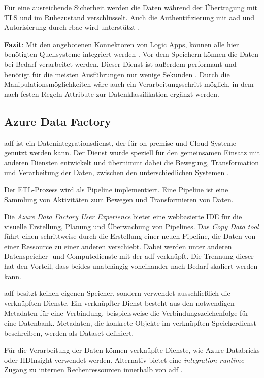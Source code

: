 Für eine ausreichende Sicherheit werden die Daten während der Übertragung mit TLS und im Ruhezustand verschlüsselt. Auch die Authentifizierung mit \ac{aad} und Autorisierung durch \ac{rbac} wird unterstützt \cite{baldwin_azure_2021-1}. 

\textbf{Fazit}: Mit den angebotenen Konnektoren von Logic Apps, können alle hier benötigten Quellsysteme integriert werden \cite[vgl.][]{fan_verwaltete_2021}. Vor dem Speichern können die Daten bei Bedarf verarbeitet werden. Dieser Dienst ist außerdem performant und benötigt für die meisten Ausführungen nur wenige Sekunden \cite{bennett_enterprise_2021}. Durch die Manipulationsmöglichkeiten wäre auch ein Verarbeitungsschritt möglich, in dem nach festen Regeln Attribute zur Datenklassifikation ergänzt werden.

\subsection{Azure Data Factory} \label{sec:grundlagen:azure_dienste:dataFactory}
\ac{adf} ist ein Datenintegrationsdienst, der für on-premise und Cloud Systeme genutzt werden kann. Der Dienst wurde speziell für den gemeinsamen Einsatz mit anderen Diensten entwickelt und übernimmt dabei die Bewegung, Transformation und Verarbeitung der Daten, zwischen den unterschiedlichen Systemen \cite{klein_iot_2017}.

Der ETL-Prozess wird als Pipeline implementiert. Eine Pipeline ist eine Sammlung von Aktivitäten zum Bewegen und Transformieren von Daten. 

Die \textit{Azure Data Factory User Experience} bietet eine webbasierte IDE für die visuelle Erstellung, Planung und Überwachung von Pipelines. Das \textit{Copy Data tool} führt einen schrittweise durch die Erstellung einer neuen Pipeline, die Daten von einer Ressource zu einer anderen verschiebt. Dabei werden unter anderen Datenspeicher- und Computedienste mit der \ac{adf} verknüpft. Die Trennung dieser hat den Vorteil, dass beides unabhängig voneinander nach Bedarf skaliert werden kann.

\ac{adf} besitzt keinen eigenen Speicher, sondern verwendet ausschließlich die verknüpften Dienste. Ein verknüpfter Dienst besteht aus den notwendigen Metadaten für eine Verbindung, beispielsweise die Verbindungszeichenfolge für eine Datenbank. Metadaten, die konkrete Objekte im verknüpften Speicherdienst beschreiben, werden als Dataset definiert. 

Für die Verarbeitung der Daten können verknüpfte Dienste, wie Azure Databricks oder HDInsight verwendet werden. Alternativ bietet eine \textit{integration runtime} Zugang zu internen Rechenressourcen innerhalb von \ac{adf} \cite{swinbank_your_2021}.

